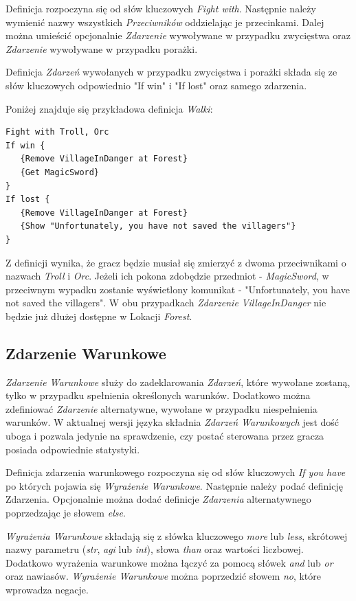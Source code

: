 \documentclass[openright]{xmgr}
\begin{document}
Definicja rozpoczyna się od słów kluczowych \textit{Fight with}. Następnie należy wymienić nazwy wszystkich \textit{Przeciwników} oddzielając je przecinkami. Dalej można umieścić opcjonalnie \textit{Zdarzenie} wywoływane w przypadku zwycięstwa oraz \textit{Zdarzenie} wywoływane w przypadku porażki.

Definicja \textit{Zdarzeń} wywołanych w przypadku zwycięstwa i porażki składa się ze słów kluczowych odpowiednio "If win" i "If lost" oraz samego zdarzenia.

Poniżej znajduje się przykładowa definicja \textit{Walki}:
\begin{verbatim}
Fight with Troll, Orc
If win {
   {Remove VillageInDanger at Forest}
   {Get MagicSword}
}
If lost {
   {Remove VillageInDanger at Forest}
   {Show "Unfortunately, you have not saved the villagers"}
}
\end{verbatim}

Z definicji wynika, że gracz będzie musiał się zmierzyć z dwoma przeciwnikami o nazwach \textit{Troll} i \textit{Orc}. Jeżeli ich pokona zdobędzie przedmiot - \textit{MagicSword}, w przeciwnym wypadku zostanie wyświetlony komunikat - "Unfortunately, you have not saved the villagers". W obu przypadkach \textit{Zdarzenie} \textit{VillageInDanger} nie będzie już dłużej dostępne w Lokacji \textit{Forest}.

\subsection{Zdarzenie Warunkowe}
\textit{Zdarzenie Warunkowe} służy do zadeklarowania \textit{Zdarzeń}, które wywołane zostaną, tylko w przypadku spełnienia określonych warunków. Dodatkowo można zdefiniować \textit{Zdarzenie} alternatywne, wywołane w przypadku niespełnienia warunków. W aktualnej wersji języka składnia \textit{Zdarzeń Warunkowych} jest dość uboga i pozwala jedynie na sprawdzenie, czy postać sterowana przez gracza posiada odpowiednie statystyki.

Definicja zdarzenia warunkowego rozpoczyna się od słów kluczowych \textit{If you have} po których pojawia się \textit{Wyrażenie Warunkowe}. Następnie należy podać definicję Zdarzenia. Opcjonalnie można dodać definicje \textit{Zdarzenia} alternatywnego poprzedzając je słowem \textit{else}.

\textit{Wyrażenia Warunkowe} składają się z słówka kluczowego \textit{more} lub \textit{less}, skrótowej nazwy parametru (\textit{str}, \textit{agi} lub \textit{int}), słowa \textit{than} oraz wartości liczbowej. Dodatkowo wyrażenia warunkowe można łączyć za pomocą słówek \textit{and} lub \textit{or} oraz nawiasów. \textit{Wyrażenie Warunkowe} można poprzedzić słowem \textit{no}, które wprowadza negacje.
\end{document}
